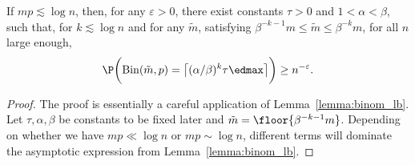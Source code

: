 \begin{lemma}
\label{lemma:geom_alg}
    If \(mp \lesssim \log n\), then, for any \(\varepsilon > 0\), there exist constants \(\tau > 0\) and \(1 < \alpha < \beta\), such that, for \(k \lesssim \log n\) and for any \(\tilde m\), satisfying \(\beta^{-k-1}m \leq \tilde m \leq \beta^{-k} m\), for all \(n\) large enough,
    \begin{equation*}
        \P\biggl(\mathrm{Bin}(\tilde m, p) = \bigl\lceil (\alpha / \beta)^{k} \tau \edmax\bigr\rceil \biggr) \geq n^{-\varepsilon}.
    \end{equation*}
\end{lemma}
\begin{proof}
    The proof is essentially a careful application of Lemma~\ref{lemma:binom_lb}.
    Let \(\tau, \alpha, \beta\) be constants to be fixed later and \(\tilde m = \floor{\beta^{-k-1}m}\). Depending on whether we have \(mp \ll \log n\) or \(mp \sim \log n\), different terms will dominate the asymptotic expression from Lemma~\ref{lemma:binom_lb}.


\end{proof}

